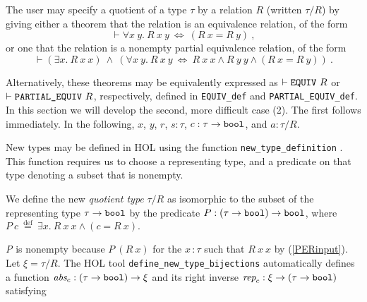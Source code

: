 \documentclass[envcountsame,runningheads]{llncs}
\def\defeq{\stackrel{\mathrm{def}}{=}}
\begin{document}
The user may specify a quotient of a type $\tau$ by a relation $R$
(written $\tau / R$) by giving
either a theorem that the relation is an equivalence relation, of the form
\begin{equation}
\vdash
\forall x\ y.\ R\ x\ y \ \Leftrightarrow \ (R\ x = R\ y) \ ,
\end{equation}
or one
that the relation is a nonempty partial equivalence relation, of the form
\begin{equation}
\label{PERinput}
\vdash
(\exists x.\ R\ x\ x) \ \wedge \
(\forall x\ y.\ R\ x\ y \ \Leftrightarrow \
                R\ x\ x \wedge R\ y\ y \wedge (R\ x = R\ y)) \ .
\end{equation}

%
Alternatively, these theorems may be equivalently expressed as
$\vdash \mbox{\tt EQUIV}\ R$ or
$\vdash \mbox{\tt PARTIAL\_EQUIV}\ R$, respectively,
defined in
{\tt EQUIV\_def}
and {\tt PARTIAL\_EQUIV\_def}.
In this section we will develop the second, more difficult case (2).
The first follows immediately.
In the following, $x$, $y$, $r$, $s : \tau$, $c : \tau\rightarrow{\tt bool}$,
and $a : \tau / R$.

New types may be defined in HOL
using the function {\tt new\_type\_definition}
\cite[sections 18.2.2.3-5]{GoMe93}.
This function requires us to
choose a representing
type, and a predicate on that type denoting a subset that is nonempty.

\begin{definition}
\label{quotient_type_def}
We define the new
{\it quotient type\/} $\tau / R$
as isomorphic to the subset of
the representing type $\tau \rightarrow \mbox{\tt bool}$
by the
predicate $P : (\tau \rightarrow \mbox{\tt bool}) \rightarrow \mbox{\tt bool}$,
where
$
P \ c \ \defeq \ \exists x.\ R\ x\ x \wedge (c = R\ x).
$
\end{definition}

\noindent
{\it P\/} is nonempty because $P\ (R\ x)$ for the $x$\,:\,$\tau$
such that $R\ x\ x$ by (\ref{PERinput}).
Let $\xi = \tau / R$.
The HOL tool
{\tt define\_new\_type\_bijections}
\cite{GoMe93} automatically defines
a function
$\mbox{\it abs}_c :(\tau \rightarrow \mbox{\tt bool}) \rightarrow  \xi$
and its right inverse
$\mbox{\it rep}_c :\xi \rightarrow (\tau \rightarrow \mbox{\tt bool}) $ satisfying
\end{document}
